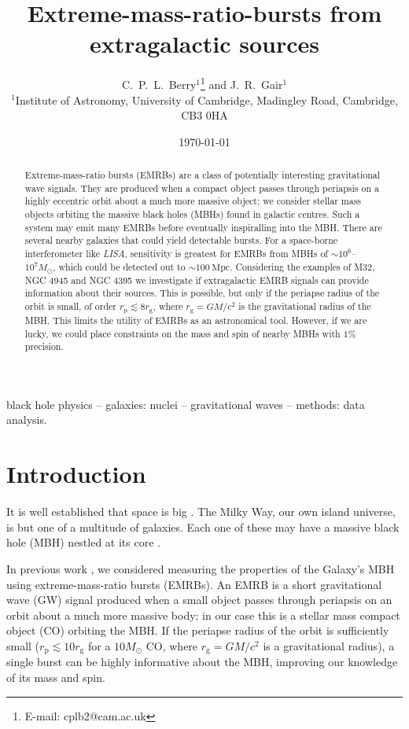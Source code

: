 \documentclass[useAMS,usedcolumn,usegraphicx,usenatbib]{mn2e}
\title[EMRBs from extragalactic sources]{Extreme-mass-ratio-bursts from extragalactic sources}
\author[C.\ P.\ L.\ Berry and J.\ R.\ Gair]{C.\ P.\ L.\ Berry$^{1}$\thanks{E-mail: cplb2@cam.ac.uk} and J.\ R.\ Gair$^{1}$\\
$^{1}$Institute of Astronomy, University of Cambridge, Madingley Road, Cambridge, CB3 0HA}
\newcommand{\units}[1]{\ensuremath{~\mathrm{#1}}}
\newcommand{\sub}[1]{\ensuremath{_\mathrm{#1}}}
\begin{document}
\date{\today}

\pagerange{\pageref{firstpage}--\pageref{lastpage}} 

\maketitle

\label{firstpage}

\begin{abstract}
Extreme-mass-ratio bursts (EMRBs) are a class of potentially interesting gravitational wave signals. They are produced when a compact object passes through periapsis on a highly eccentric orbit about a much more massive object; we consider stellar mass objects orbiting the massive black holes (MBHs) found in galactic centres. Such a system may emit many EMRBs before eventually inspiralling into the MBH. There are several nearby galaxies that could yield detectable bursts. For a space-borne interferometer like \textit{LISA}, sensitivity is greatest for EMRBs from MBHs of $\sim10^6$--$10^7 M_\odot$, which could be detected out to $\sim 100\units{Mpc}$. Considering the examples of M32, NGC 4945 and NGC 4395 we investigate if extragalactic EMRB signals can provide information about their sources. This is possible, but only if the periapse radius of the orbit is small, of order $r\sub{p} \lesssim 8 r\sub{g}$, where $r\sub{g} = GM/c^2$ is the gravitational radius of the MBH. This limits the utility of EMRBs as an astronomical tool. However, if we are lucky, we could place constraints on the mass and spin of nearby MBHs with $1\%$ precision.
\end{abstract}

\begin{keywords}
black hole physics -- galaxies: nuclei -- gravitational waves -- methods: data analysis.
\end{keywords}

\section{Introduction}\label{sec:Intro}

It is well established that space is big \citep[chapter 8]{Adams1979}. The Milky Way, our own island universe, is but one of a multitude of galaxies. Each one of these may have a massive black hole (MBH) nestled at its core \citep{Lynden-Bell1971, Soltan1982}.

In previous work \citep{Berry2013}, we considered measuring the properties of the Galaxy's MBH using extreme-mass-ratio bursts (EMRBs). An EMRB is a short gravitational wave (GW) signal produced when a small object passes through periapsis on an orbit about a much more massive body; in our case this is a stellar mass compact object (CO) orbiting the MBH. If the periapse radius of the orbit is sufficiently small ($r\sub{p} \lesssim 10 r\sub{g}$ for a $10 M_\odot$ CO, where $r\sub{g} = GM/c^2$ is a gravitational radius), a single burst can be highly informative about the MBH, improving our knowledge of its mass and spin.
\end{document}
